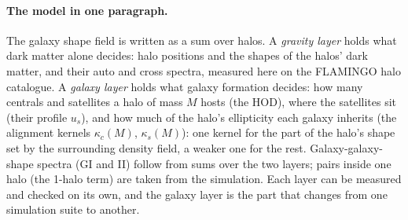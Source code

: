 \documentclass[11pt]{article}
\newcommand{\kc}{\kappa_c}
\newcommand{\ks}{\kappa_s}
\begin{document}
\paragraph{The model in one paragraph.} The galaxy shape field is written
as a sum over halos. A \emph{gravity layer} holds what dark matter alone
decides: halo positions and the shapes of the halos' dark matter, and
their auto and cross spectra, measured here on the FLAMINGO halo catalogue.
A \emph{galaxy layer} holds what galaxy formation decides: how many
centrals and satellites a halo of mass $M$ hosts (the HOD), where the
satellites sit (their profile $u_s$), and how much of the halo's
ellipticity each galaxy inherits (the alignment kernels $\kc(M)$, $\ks(M)$):
one kernel for the part of the halo's shape set by the surrounding density
field, a weaker one for the rest.
Galaxy-galaxy-shape spectra (GI and II) follow from sums over the two layers;
pairs inside one halo (the 1-halo term) are taken from the simulation.
Each layer can be measured and checked on its own, and the galaxy layer is
the part that changes from one simulation suite to another.
\end{document}
